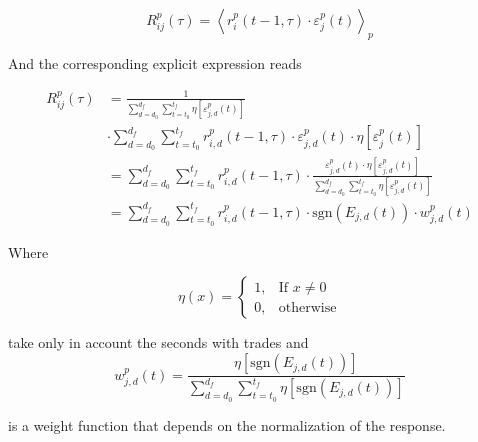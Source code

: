 \begin{equation}\label{eq:response_functions_time_scale_general}
    R^{p}_{ij}\left(\tau\right)=\left\langle r^{p}_{i}\left(t-1, \tau\right)
    \cdot\varepsilon_{j}^{p} \left(t\right)
    \right\rangle _{p}
\end{equation}

And the corresponding explicit expression reads

\begin{align}\label{eq:response_seconds_explicit}
    R_{ij}^{p}\left(\tau\right)&=\frac{1}{\sum_{d=d_{0}}^{d_{f}}
    \sum_{t=t_{0}}^{t_{f}} \eta\left[ \varepsilon_{j,d}^{p}
    \left(t\right)\right]} \nonumber \\
    &\cdot\sum_{d=d_{0}}^{d_{f}} \sum_{t=t_{0}}^{t_{f}}
    r^{p}_{i,d}\left(t-1,\tau\right) \cdot\varepsilon_{j,d}^{p}\left(t\right)
    \cdot\eta\left[\varepsilon_{j}^{p} \left(t\right)\right] \\
    &=\sum_{d=d_{0}}^{d_{f}}\sum_{t=t_{0}}^{t_{f}}r^{p}_{i,d}
    \left(t-1,\tau\right) \cdot\frac{\varepsilon_{j,d}^{p}\left(t\right)
    \cdot\eta\left[\varepsilon_{j,d}^{p} \left( t\right)\right]}
    {\sum_{d=d_{0}}^{d_{f}}\sum_{t=t_{0}}^{t_{f}}\eta
    \left[\varepsilon_{j,d}^{p} \left(t\right)\right]} \nonumber \\
    &=\sum_{d=d_{0}}^{d_{f}}\sum_{t=t_{0}}^{t_{f}}r^{p}_{i,d}
    \left(t-1,\tau\right) \cdot\text{sgn}\left(E_{j,d}\left(t\right)\right)
    \cdot w_{j,d}^{p}\left(t\right)
\end{align}

Where

\begin{equation}
    \eta\left(x\right)=\left\{ \begin{array}{cc}
    1, & \text{If }x\ne0 \\
    0, & \text{otherwise}
    \end{array}\right.
\end{equation}

take only in account the seconds with trades and
\begin{equation}
    w_{j,d}^{p}\left(t\right) = \frac{\eta\left[\text{sgn}
    \left(E_{j,d}\left( t\right)\right)\right]}{\sum_{d=d_{0}}^{d_{f}}
    \sum_{t=t_{0}}^{t_{f}} \eta\left[\text{sgn}\left(E_{j,d}
    \left(t\right)\right)\right]}
\end{equation}

is a weight function that depends on the normalization of the response.

